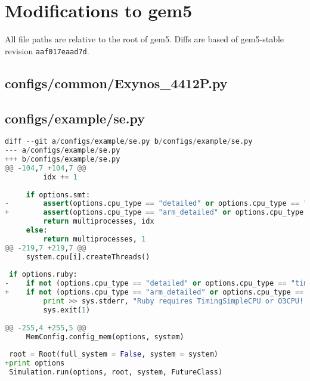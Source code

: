 \chapter{Modifications to gem5}
\label{apx:gem5files}
All file paths are relative to the root of gem5. Diffs are based of gem5-stable revision \texttt{aaf017eaad7d}.

\section{configs/common/Exynos\_4412P.py}
\label{gem5exynos4412p}

\vfill

\section{configs/example/se.py}
\begin{lstlisting}[language=python]
diff --git a/configs/example/se.py b/configs/example/se.py
--- a/configs/example/se.py
+++ b/configs/example/se.py
@@ -104,7 +104,7 @@
         idx += 1
 
     if options.smt:
-        assert(options.cpu_type == "detailed" or options.cpu_type == "inorder")
+        assert(options.cpu_type == "arm_detailed" or options.cpu_type == "inorder")
         return multiprocesses, idx
     else:
         return multiprocesses, 1
@@ -219,7 +219,7 @@
     system.cpu[i].createThreads()
 
 if options.ruby:
-    if not (options.cpu_type == "detailed" or options.cpu_type == "timing"):
+    if not (options.cpu_type == "arm_detailed" or options.cpu_type == "timing"):
         print >> sys.stderr, "Ruby requires TimingSimpleCPU or O3CPU!!"
         sys.exit(1)
 
@@ -255,4 +255,5 @@
     MemConfig.config_mem(options, system)
 
 root = Root(full_system = False, system = system)
+print options
 Simulation.run(options, root, system, FutureClass)
\end{lstlisting}
\vfill

